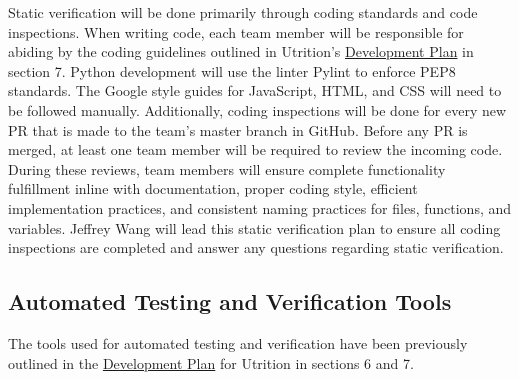 \documentclass[12pt, titlepage]{article}
\begin{document}
	Static verification will be done primarily through coding standards and 
	code inspections. When writing code, each team member will be responsible 
	for abiding by the coding guidelines outlined in Utrition's 
	\href{https://github.com/jeff-rey-wang/utrition/blob/dff32f8ddc662d07db9bd74e0b3705aa657dae6e/docs/DevelopmentPlan/DevelopmentPlan.pdf}{Development
	 Plan} in section 7. Python development will use the linter Pylint to 
	enforce PEP8 standards. The Google style guides for JavaScript, HTML, and 
	CSS will need to be followed manually. Additionally, coding inspections 
	will be done for every new PR that is made to the team's master branch in 
	GitHub. Before any PR is merged, at least one team member will be required 
	to review the incoming code. During these reviews, team members will ensure 
	complete functionality fulfillment inline with documentation, proper coding 
	style, efficient implementation practices, and consistent naming practices 
	for files, functions, and variables. Jeffrey Wang will lead this static 
	verification plan to ensure all coding inspections are completed and answer 
	any questions regarding static verification.
	
	\subsection{Automated Testing and Verification Tools}
	
	
	
	
	The tools used for automated testing and verification have been previously outlined in the \href{https://github.com/jeff-rey-wang/utrition/blob/dff32f8ddc662d07db9bd74e0b3705aa657dae6e/docs/DevelopmentPlan/DevelopmentPlan.pdf}{Development Plan} for Utrition in sections 6 and 7. 
	
\end{document}
